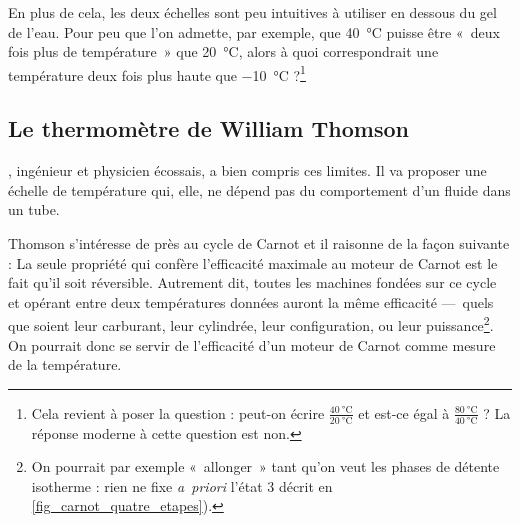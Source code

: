 		En plus de cela, les deux échelles sont peu intuitives à utiliser en dessous du gel de l’eau. Pour peu que l’on admette, par exemple, que \SI{40}{\celsius} puisse être «~deux fois plus de température~» que \SI{20}{\celsius}, alors à quoi correspondrait une température deux fois plus haute que \SI{-10}{\celsius} ?\footnote{Cela revient à poser la question : peut-on écrire $\frac{\SI{40}{\celsius}}{\SI{20}{\celsius}}$ et est-ce égal à $\frac{\SI{80}{\celsius}}{\SI{40}{\celsius}}$ ? La réponse moderne à cette question est non.}
		
	
	\subsection{Le thermomètre de William Thomson}
	
		, ingénieur et physicien écossais, a bien compris ces limites. Il va proposer une échelle de température qui, elle, ne dépend pas du comportement d’un fluide dans un tube.

		Thomson s’intéresse de près au cycle de Carnot et il raisonne de la façon suivante : La seule propriété qui confère l’efficacité maximale au moteur de Carnot est le fait qu’il soit réversible. Autrement dit, toutes les machines fondées sur ce cycle et opérant entre deux températures données auront la même efficacité —\ quels que soient leur carburant, leur cylindrée, leur configuration, ou leur puissance\footnote{On pourrait par exemple «~allonger~» tant qu’on veut les phases de détente isotherme : rien ne fixe \textit{a~priori} l’état 3 décrit en \cref{fig_carnot_quatre_etapes}).}. On pourrait donc se servir de l’efficacité d’un moteur de Carnot comme mesure de la température.
		
